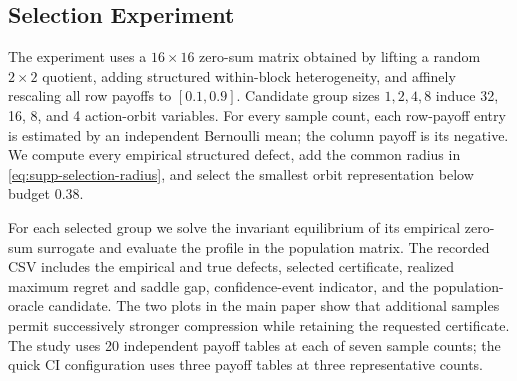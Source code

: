 \subsection{Selection Experiment}

The experiment uses a $16\times16$ zero-sum matrix obtained by lifting a random $2\times2$ quotient, adding structured within-block heterogeneity, and affinely rescaling all row payoffs to $[0.1,0.9]$.  Candidate group sizes $1,2,4,8$ induce 32, 16, 8, and 4 action-orbit variables.  For every sample count, each row-payoff entry is estimated by an independent Bernoulli mean; the column payoff is its negative.  We compute every empirical structured defect, add the common radius in \eqref{eq:supp-selection-radius}, and select the smallest orbit representation below budget $0.38$.

For each selected group we solve the invariant equilibrium of its empirical zero-sum surrogate and evaluate the profile in the population matrix.  The recorded CSV includes the empirical and true defects, selected certificate, realized maximum regret and saddle gap, confidence-event indicator, and the population-oracle candidate.  The two plots in the main paper show that additional samples permit successively stronger compression while retaining the requested certificate.  The study uses 20 independent payoff tables at each of seven sample counts; the quick CI configuration uses three payoff tables at three representative counts.
